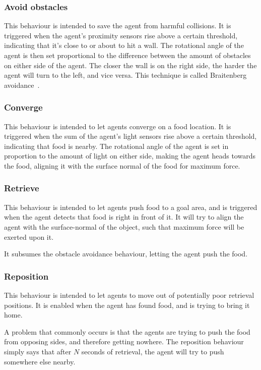\documentclass[a4paper]{article}
\begin{document}
\subsubsection{Avoid obstacles}
This behaviour is intended to save the agent from harmful collisions.
It is triggered when the agent's proximity sensors rise above a certain threshold, indicating that it's close to or about to hit a wall.
The rotational angle of the agent is then set proportional to the difference between the amount of obstacles on either side of the agent.
The closer the wall is on the right side, the harder the agent will turn to the left, and vice versa.
This technique is called Braitenberg avoidance~\cite{braitenberg}.

\subsubsection{Converge}
This behaviour is intended to let agents converge on a food location.
It is triggered when the sum of the agent's light sensors rise above a certain threshold, indicating that food is nearby.
The rotational angle of the agent is set in proportion to the amount of light on either side, making the agent heads towards the food, aligning it with the surface normal of the food for maximum force.

\subsubsection{Retrieve}
This behaviour is intended to let agents push food to a goal area, and is triggered when the agent detects that food is right in front of it.
It will try to align the agent with the surface-normal of the object, such that maximum force will be exerted upon it.

It subsumes the obstacle avoidance behaviour, letting the agent push the food.

\subsubsection{Reposition}
This behaviour is intended to let agents to move out of potentially poor retrieval positions.
It is enabled when the agent has found food, and is trying to bring it home.

A problem that commonly occurs is that the agents are trying to push the food from opposing sides, and therefore getting nowhere.
The reposition behaviour simply says that after $ N $ seconds of retrieval, the agent will try to push somewhere else nearby.
\end{document}
